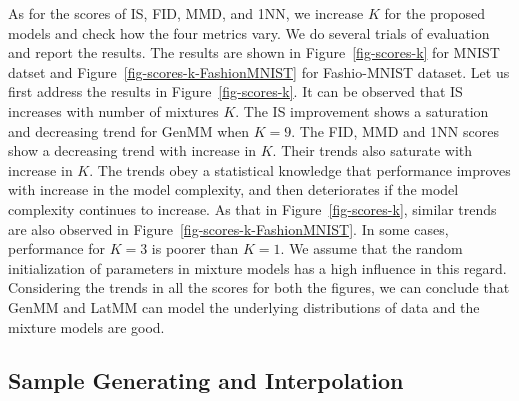 As for the scores of IS, FID, MMD, and 1NN, we increase $K$ for the proposed models and check
how the four metrics vary. We do several trials of evaluation and
report the results. The results are shown in
Figure~\ref{fig-scores-k} for MNIST datset and
Figure~\ref{fig-scores-k-FashionMNIST} for Fashio-MNIST dataset. Let us
first address the results in Figure~\ref{fig-scores-k}. It can be
observed that IS increases with number of mixtures $K$. The IS
improvement shows a saturation and decreasing trend for GenMM when
$K=9$. The FID, MMD and 1NN scores show a decreasing trend with
increase in $K$. Their trends also saturate with increase in $K$. The
trends obey a statistical knowledge that performance improves with
increase in the model complexity, and then deteriorates if the model
complexity continues to increase. As that in Figure~\ref{fig-scores-k}, similar trends are also observed in Figure~\ref{fig-scores-k-FashionMNIST}. In some cases, performance for $K=3$ is poorer than $K=1$. We assume that the random initialization of parameters in mixture models has a high influence in this regard. 
Considering the trends in all the scores for both the figures, we can conclude that GenMM and LatMM can model the underlying distributions of data and the mixture models are good.

\subsection{Sample Generating and Interpolation}


